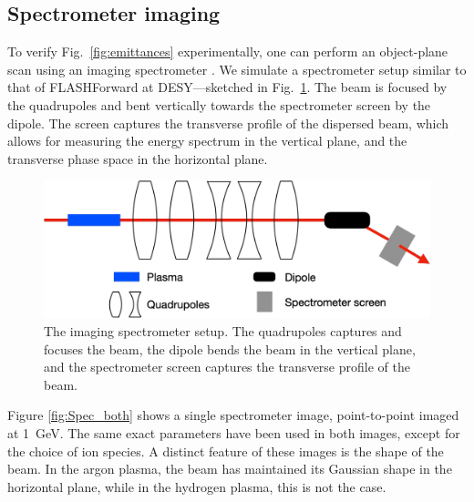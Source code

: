 \documentclass[a4paper,
               biblatex,     %
               ]{jacow}
\begin{document}
\subsection{Spectrometer imaging}
To verify Fig.~\ref{fig:emittances} experimentally, one can perform an object-plane scan using an imaging spectrometer \cite{Lindstrom}. We simulate a spectrometer setup similar to that of FLASHForward at DESY---sketched in Fig.~\ref{fig:FF diagnostics}. The beam is focused by the quadrupoles and bent vertically towards the spectrometer screen by the dipole. The screen captures the transverse profile of the dispersed beam, which allows for measuring the energy spectrum in the vertical plane, and the transverse phase space in the horizontal plane.
\begin{figure}
    \centering
    \includegraphics[width=0.9\linewidth]{TUPS013_f4.pdf}
    \caption{The imaging spectrometer setup. The quadrupoles captures and focuses the beam, the dipole bends the beam in the vertical plane, and the spectrometer screen captures the transverse profile of the beam.}
    \label{fig:FF diagnostics}
\end{figure}
Figure \ref{fig:Spec_both} shows a single spectrometer image, point-to-point imaged at \SI{1}{GeV}. The same exact parameters have been used in both images, except for the choice of ion species. A distinct feature of these images is the shape of the beam. In the argon plasma, the beam has maintained its Gaussian shape in the horizontal plane, while in the hydrogen plasma, this is not the case.
\end{document}
